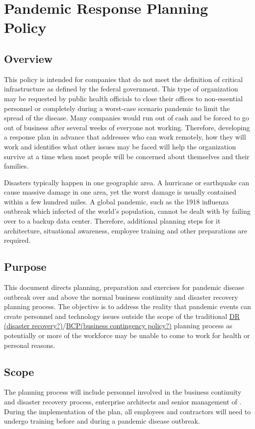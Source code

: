 \chapter{Pandemic Response Planning Policy}\label{G:PRPP}
\CommonIntroduction
\section{Overview}
This policy is intended for companies that do not meet the definition of critical infrastructure as defined by the federal government.  
This type of organization may be requested by public health officials to close their offices to non-essential personnel or completely during a worst-case scenario pandemic to limit the spread of the disease.  
Many companies would run out of cash and be forced to go out of business after several weeks of everyone not working.  
Therefore, developing a response plan in advance that addresses who can work remotely, how they will work and identifies what other issues may be faced will help the organization survive at a time when most people will be concerned about themselves and their families.

Disasters typically happen in one geographic area.  
A hurricane or earthquake can cause massive damage in one area, yet the worst damage is usually contained within a few hundred miles.  
A global pandemic, such as the 1918 influenza outbreak which infected  of the world's population, cannot be dealt with by failing over to a backup data center.  
Therefore, additional planning steps for \gls{it} architecture, situational awareness, employee training\oxford{} and other preparations are required.
\section{Purpose}
This document directs planning, preparation and exercises for pandemic disease outbreak over and above the normal business continuity and disaster recovery planning process.  
The objective is to address the reality that pandemic events can create personnel and technology issues outside the scope of the traditional \uline{DR (disaster recovery?)}/\uline{BCP(business contingency policy?)} planning process as potentially  or more of the workforce may be unable to come to work for health or personal reasons.
\section{Scope}
The planning process will include personnel involved in the business continuity and disaster recovery process, enterprise architects and senior management of \CompanyName{}.  
During the implementation of the plan, all employees and contractors will need to undergo training before and during a pandemic disease outbreak.
